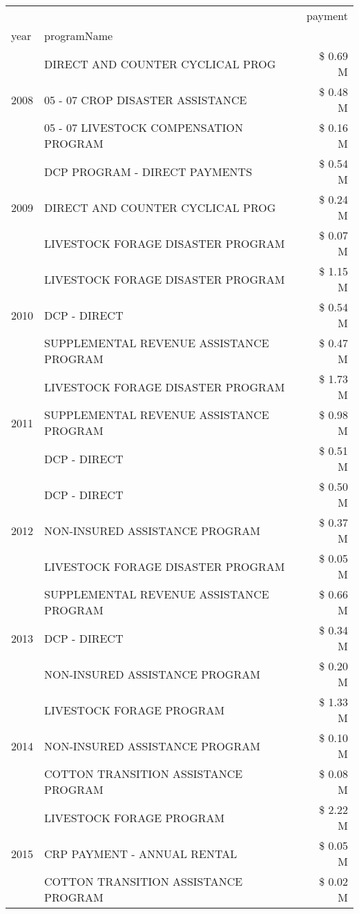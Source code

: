 \begin{tabular}{llr}
\toprule
 &  & payment \\
year & programName &  \\
\midrule
\multirow[t]{3}{*}{2008} & DIRECT AND COUNTER CYCLICAL PROG & \$ 0.69 M \\
 & 05 - 07 CROP DISASTER ASSISTANCE & \$ 0.48 M \\
 & 05 - 07 LIVESTOCK COMPENSATION PROGRAM & \$ 0.16 M \\
\cline{1-3}
\multirow[t]{3}{*}{2009} & DCP PROGRAM - DIRECT PAYMENTS & \$ 0.54 M \\
 & DIRECT AND COUNTER CYCLICAL PROG & \$ 0.24 M \\
 & LIVESTOCK FORAGE DISASTER  PROGRAM & \$ 0.07 M \\
\cline{1-3}
\multirow[t]{3}{*}{2010} & LIVESTOCK FORAGE DISASTER PROGRAM & \$ 1.15 M \\
 & DCP - DIRECT & \$ 0.54 M \\
 & SUPPLEMENTAL REVENUE ASSISTANCE PROGRAM & \$ 0.47 M \\
\cline{1-3}
\multirow[t]{3}{*}{2011} & LIVESTOCK FORAGE DISASTER PROGRAM & \$ 1.73 M \\
 & SUPPLEMENTAL REVENUE ASSISTANCE PROGRAM & \$ 0.98 M \\
 & DCP - DIRECT & \$ 0.51 M \\
\cline{1-3}
\multirow[t]{3}{*}{2012} & DCP - DIRECT & \$ 0.50 M \\
 & NON-INSURED ASSISTANCE PROGRAM & \$ 0.37 M \\
 & LIVESTOCK FORAGE DISASTER PROGRAM & \$ 0.05 M \\
\cline{1-3}
\multirow[t]{3}{*}{2013} & SUPPLEMENTAL REVENUE ASSISTANCE PROGRAM & \$ 0.66 M \\
 & DCP - DIRECT & \$ 0.34 M \\
 & NON-INSURED ASSISTANCE PROGRAM & \$ 0.20 M \\
\cline{1-3}
\multirow[t]{3}{*}{2014} & LIVESTOCK FORAGE PROGRAM & \$ 1.33 M \\
 & NON-INSURED ASSISTANCE PROGRAM & \$ 0.10 M \\
 & COTTON TRANSITION ASSISTANCE PROGRAM & \$ 0.08 M \\
\cline{1-3}
\multirow[t]{3}{*}{2015} & LIVESTOCK FORAGE PROGRAM & \$ 2.22 M \\
 & CRP PAYMENT - ANNUAL RENTAL & \$ 0.05 M \\
 & COTTON TRANSITION ASSISTANCE PROGRAM & \$ 0.02 M \\
\cline{1-3}

\end{tabular}
